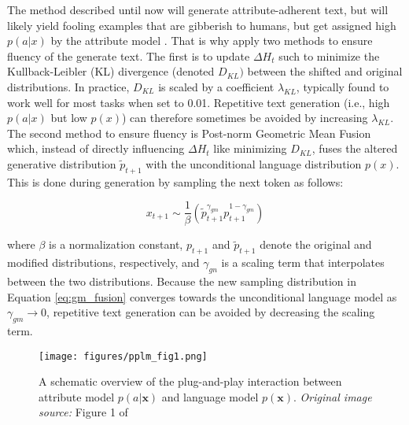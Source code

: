 The method described until now will generate attribute-adherent text, but will likely yield fooling examples \citep{nguyen2015deep} that are gibberish to humans, but get assigned high $p(a | x)$ by the attribute model \citep{dathathri2019plug}. That is why \cite{dathathri2019plug} apply two methods to ensure fluency of the generate text. The first is to update $\Delta H_t$ such to minimize the Kullback-Leibler (KL) divergence (denoted $D_{KL})$ between the shifted and original distributions. In practice, $D_{KL}$ is scaled by a coefficient $\lambda_{KL}$, typically found to work well for most tasks when set to 0.01. Repetitive text generation (i.e., high $p(a | x)$ but low $p(x)$) can therefore sometimes be avoided by increasing $\lambda_{KL}$. The second method to ensure fluency is Post-norm Geometric Mean Fusion \citep{stahlberg-etal-2018-simple} which, instead of directly influencing $\Delta H_t$ like minimizing $D_{KL}$, fuses the altered generative distribution $\tilde{p}_{t + 1}$ with the unconditional language distribution $p(x)$. This is done during generation by sampling the next token as follows:

\begin{equation}
    x_{t + 1} \sim \frac{1}{\beta}
    \left( 
    \tilde{p}_{t + 1}^{\gamma_{gm}} p_{t + 1}^{1 - \gamma_{gm}}
    \right)
    \label{eq:gm_fusion}
\end{equation}

where $\beta$ is a normalization constant, $p_{t + 1}$ and $\tilde{p}_{t + 1}$ denote the original and modified distributions, respectively, and $\gamma_{gn}$ is a scaling term that interpolates between the two distributions. Because the new sampling distribution in Equation \ref{eq:gm_fusion} converges towards the unconditional language model as $\gamma_{gm} \rightarrow 0$, repetitive text generation can be avoided by decreasing the scaling term.


\begin{figure}[H]
    \centering
    \texttt{[image: figures/pplm\_fig1.png]}
    \caption{A schematic overview of the plug-and-play interaction between attribute model $p(a | \textbf{x})$ and language model $p(\textbf{x})$. \textit{Original image source:} Figure 1 of \cite{dathathri2019plug}}
    \label{fig:pplm_schematic_overview}
\end{figure}



